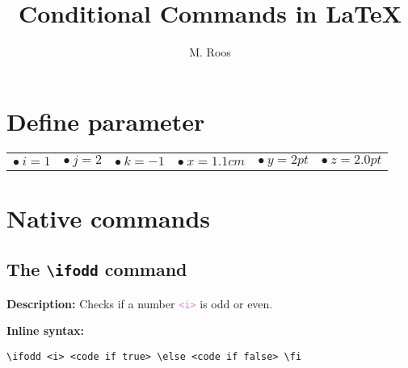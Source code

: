 \documentclass[12pt]{article}
\title{Conditional Commands in \LaTeX}
\author{M. Roos}
\renewcommand{\i}{1}
\renewcommand{\j}{2}
\renewcommand{\k}{-1}
\newcommand{\x}{1.1cm}
\newcommand{\y}{2pt}
\newcommand{\z}{2.0pt}
\begin{document}
\maketitle
	
\section{Define parameter}
\begin{center}
		\begin{tabular}{@{}cccccc@{}}
			$\bullet~i = \i$ & \hspace{0.5cm} $\bullet~j = \j$ & \hspace{0.5cm} $\bullet~k = \k$ & \hspace{0.5cm} $\bullet~x = \x$ & \hspace{0.5cm} $\bullet~y = \y$ & \hspace{0.5cm} $\bullet~z = \z$ \\
		\end{tabular}
\end{center}

\section{Native commands}
	
\subsection{The \texttt{\textbackslash ifodd} command}
	\noindent\textbf{Description:} Checks if a number \textcolor{violet}{\texttt{<i>}} is odd or even.

	\noindent\textbf{Inline syntax:}
	\begin{lstlisting}
\ifodd <i> <code if true> \else <code if false> \fi
	\end{lstlisting}
\end{document}
